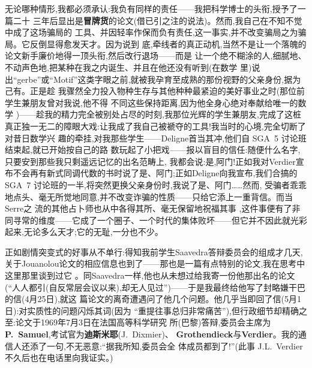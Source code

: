 \pmark{}无论哪种情形,我都必须承认:我负有同样的责任——我把科学博士的头衔,授予了一篇二十
三年后显出是\textbf{冒牌货}的论文(借已引之注的说法)。然而,我自己在不知不觉中成了这场骗局的
工具、并因轻率作保而负有责任,这一事实,并不改变骗局之为骗局。它反倒显得愈发天才。因为说到
底,牵线者的真正动机,当然不是让一个落魄的论文新手廉价地得一顶头衔,然后改行退场——而是
让一个绝不糊涂的人,细腻地、不动声色地,把某种在我之内诞生、并且在他还没有听到(在数学
里)说出“gerbe”或“Motif”这类字眼之前,就被我孕育至成熟的那份视野的父亲身份,据为己有。正是趁
我骤然全力投入物种生存与其他种种最紧迫的美好事业之时(那位前学生兼朋友曾对我说,他不得
不同这些保持距离,因为他全身心绝对奉献给唯一的数学
)——趁我的精力完全被别处占尽的时刻,我那位光辉的学生兼朋友,完成了这桩
真正独一无二的障眼大戏:让我成了我自己被褫夺的工具!我当时的心境,完全切断了对昔日数学兴
趣的牵挂,对我那些学生——Deligne首当其冲,他们自 SGA~5 讨论班结束起,就已开始按自己的路
数玩起了小把戏——报以盲目的信任:随便什么名字,只要安到那些我只剩遥远记忆的出名范畴上,
我都会说:是,阿门!正如我对Verdier宣布不会再有新式同调代数的书时说了是、阿门;正如Deligne向我宣布,我们合搞的 SGA~7 讨论班的一半,将突然更换父亲身份时,我说了是、阿门……然而,
受骗者乖乖地点头、毫无所觉地同意,并不改变诈骗的性质——只给它添上一重背信。而当Serre之
流的其他占卜师也从中各得其所、毫无保留地祝福其事
,这件事便有了非同寻常的维度\dmark{}——它成了一个圈子、一个时代的集体败坏——但它并不因此就光彩起来,无论多么天才;它的无耻,一分也不少。

正如剧情突变式的好事从不单行:得知我前学生Saavedra答辩委员会的组成才几天,关于Jouanolou论文的相应信息也到了——那也是一篇有点特别的论文,我在思考中这里那里谈到过它
。同Saavedra一样,他也从未想过给我寄一份他那出名的论文(“人人都引(自反常层会议以来),却无人见过”)——于是我最终给他写了封略嫌干巴的信(4月25日),就这
篇论文的离奇遭遇问了他几个问题。他几乎当即回了信(5月1日):对实质性的问题闪烁其词(因为
“重提往事总归非常痛苦”),但行政细节却精确之至:论文于1969年7月3日在法国高等科学研究
所(巴黎)答辩,委员会主席为\textbf{P.~Samuel},考试官为\textbf{迪斯米耶}(J.~Dixmier)、
\textbf{Grothendieck}与\textbf{Verdier}。我的通信人还添了一句,不无恶意:“据我所知,委员会全
体成员都到了!”(此事 J.L.~Verdier不久后也在电话里向我证实。)

